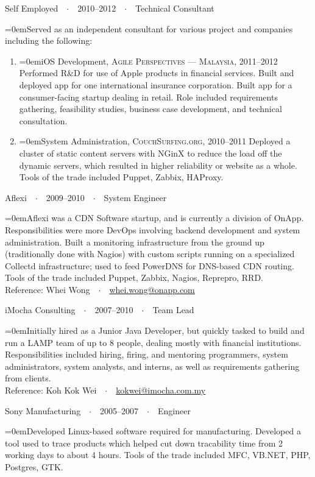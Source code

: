 \documentclass[a4paper]{scrartcl}
\newcommand{\Description}[1]{\hangindent=0em\hangafter=0\noindent\footnotesize{#1}\par\normalsize\vspace{1em}} %
\newcommand{\Redvline}[0]{\vspace{0em}\noindent{\color{ThemeColor}\rule{18cm}{0.4pt}}\vspace{-0.5em}}
\newcommand{\NewBlock}[3]{
    #1\ \ $\cdotp$\ \ #2\ \ $\cdotp$\ \ #3}
\begin{document}
\NewBlock{Self Employed}{2010--2012}{Technical Consultant}

\Description{Served as an independent consultant for various project and companies including the following:}
\begin{enumerate}
\item[] \Description{iOS Development, \textsc{Agile Perspectives --- Malaysia}, 2011--2012
\newline
Performed R\&D for use of Apple products in financial services. Built and deployed app for one international insurance corporation. Built app for a consumer-facing startup dealing in retail. Role included requirements gathering, feasibility studies, business case development, and technical consultation. }

\item[] \Description{System Administration, \textsc{CouchSurfing.org}, 2010--2011
\newline
Deployed a cluster of static content servers with NGinX to reduce the load off the dynamic servers, which resulted in higher reliability or website as a whole. Tools of the trade included Puppet, Zabbix, HAProxy. }
\end{enumerate}

\NewBlock{Aflexi}{2009--2010}{System Engineer}

\Description{Aflexi was a CDN Software startup, and is currently a division of OnApp. Responsibilities were more DevOps involving backend development and system administration. Built a monitoring infrastructure from the ground up (traditionally done with Nagios) with custom scripts running on a specialized Collectd infrastructure; used to feed PowerDNS for DNS-based CDN routing. Tools of the trade included Puppet, Zabbix, Nagios, Reprepro, RRD.
\\Reference: Whei Wong\ \ $\cdotp$\ \ \href{mailto:whei.wong@onapp.com}{whei.wong@onapp.com}}


\NewBlock{iMocha Consulting}{2007--2010}{Team Lead}

\Description{Initially hired as a Junior Java Developer, but quickly tasked to build and run a LAMP team of up to 8 people, dealing mostly with financial institutions. Responsibilities included hiring, firing, and mentoring programmers, system administrators, system analysts, and interns, as well as requirements gathering from clients.
\\Reference: Koh Kok Wei\ \ $\cdotp$\ \ \href{mailto:kokwei@imocha.com.my}{kokwei@imocha.com.my}}

\NewBlock{Sony Manufacturing}{2005--2007}{Engineer}

\Description{Developed Linux-based software required for manufacturing. Developed a tool used to trace products which helped cut down tracability time from 2 working days to about 4 hours. Tools of the trade included MFC, VB.NET, PHP, Postgres, GTK.}
\Redvline
\end{document}

